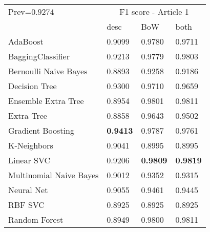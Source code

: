 \begin{tabular}{|l|l|l|l| }
\hline
Prev=0.9274 &  \multicolumn{3}{c|}{F1 score - Article 1} \\
\cline{2-4} & desc & BoW & both \\ \hline
AdaBoost                & 0.9099 & 0.9780 & 0.9711\\
BaggingClassifier       & 0.9213 & 0.9779 & 0.9803\\
Bernoulli Naive Bayes   & 0.8893 & 0.9258 & 0.9186\\
Decision Tree           & 0.9300 & 0.9710 & 0.9659\\
Ensemble Extra Tree     & 0.8954 & 0.9801 & 0.9811\\
Extra Tree              & 0.8858 & 0.9643 & 0.9502\\
Gradient Boosting       & {\bf 0.9413} & 0.9787 & 0.9761\\
K-Neighbors             & 0.9041 & 0.8995 & 0.8995\\
Linear SVC              & 0.9206 & {\bf 0.9809} & {\bf 0.9819}\\
Multinomial Naive Bayes & 0.9012 & 0.9352 & 0.9315\\
Neural Net              & 0.9055 & 0.9461 & 0.9445\\
RBF SVC                 & 0.8925 & 0.8925 & 0.8925\\
Random Forest           & 0.8949 & 0.9800 & 0.9811\\
\hline
\end{tabular}